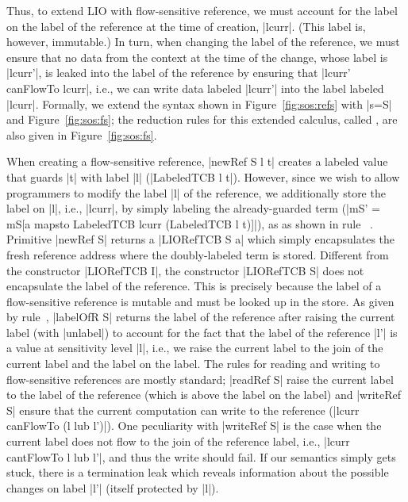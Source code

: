 Thus, to extend LIO with flow-sensitive reference, we must account for the label
on the label of the reference at the time of creation, |lcurr|.
%
(This label is, however, immutable.)
%
In turn, when changing the label of the reference, we must ensure that no data
from the context at the time of the change, whose label is |lcurr'|, is leaked
into the label of the reference by ensuring that |lcurr' canFlowTo lcurr|,
i.e., we can write data labeled |lcurr'| into the label labeled |lcurr|.
%
Formally, we extend the \lio{} syntax shown in Figure~\ref{fig:sos:refs}
with |s=S| and Figure~\ref{fig:sos:fs};
%
the reduction rules for this extended calculus, called \liofs{}, are also
given in Figure~\ref{fig:sos:fs}.

When creating a flow-sensitive reference, |newRef S l t| creates a labeled
value that guards |t| with label |l| (|LabeledTCB l t|).
%
However, since we wish to allow programmers to modify the label |l| of the
reference, we additionally store the label on |l|, i.e., |lcurr|, by simply
labeling the already-guarded term (|mS' = mS[a mapsto LabeledTCB lcurr
(LabeledTCB l t)]|), as as shown in rule~ .
%
Primitive |newRef S| returns a |LIORefTCB S a| which simply encapsulates the fresh
reference address where the doubly-labeled term is stored.
%
Different from the constructor |LIORefTCB I|,  the constructor |LIORefTCB S|
does not encapsulate the label of the reference. 
%
This is precisely because the label of a flow-sensitive reference is 
mutable and must be looked up in the store.
%
As given by rule~, |labelOfR S| returns the label of the
reference after raising the current label (with |unlabel|) to account for the
fact that the label of the reference |l'| is a value at sensitivity level |l|,
i.e., we raise the current label to the join of the current label and the label
on the label.
%
The rules for reading and writing to flow-sensitive references are mostly
standard; |readRef S| raise the current label to the label of the reference
(which is above the label on the label) and |writeRef S| ensure that the
current computation can write to the reference (|lcurr canFlowTo (l lub l')|).
%
One peculiarity with |writeRef S| is the case when the current label does not
flow to the join of the reference label, i.e., |lcurr cantFlowTo l lub l'|, and
thus the write should fail.
%
If our semantics simply gets stuck, there is a termination leak which reveals
information about the possible changes on label |l'| (itself protected by |l|).

